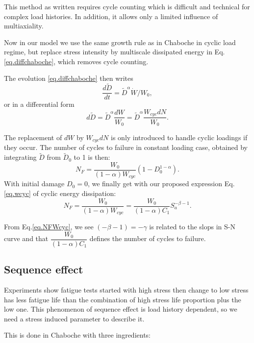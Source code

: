 This method as written requires cycle counting which is difficult and technical for complex load histories. In addition, it allows only a limited influence of multiaxiality.


Now in our model we use the same growth rule as in Chaboche in cyclic load regime, but replace stress intensity by multiscale dissipated energy  in Eq.\eqref{eq.diffchaboche}, which removes cycle counting.

The evolution \eqref{eq.diffchaboche} then writes
$$
\dfrac{d\tilde{D}}{dt} ={\tilde{D}}^\alpha \dot{W}/W_0,
$$
or in a differential form
\begin{equation}
d \tilde{D}=\tilde{D}^\alpha\dfrac{d W}{W_0}=\tilde{D}^\alpha\dfrac{W_{cyc}d N}{W_0}.
\label{eq.DWcyc}
\end{equation}

The replacement of $d W$ by $W_{cyc}dN$ is only introduced to handle cyclic loadings if they occur. The number of cycles to failure in constant loading case, obtained by integrating $\tilde{D}$ from $\tilde{D}_0$ to 1 is then:
$$N_F=\dfrac{W_0}{\left( 1-\alpha\right)W_{cyc} }\left( 1-D_0^{1-\alpha}\right) .$$
With initial damage $D_0=0$, we finally get with our proposed expression Eq.\eqref{eq.wcyc} of cyclic energy dissipation:
\begin{equation}
N_F=\dfrac{W_0}{\left( 1-\alpha\right)W_{cyc} }=\dfrac{W_0}{(1-\alpha)C_1}S_{a}^{-\beta-1}.
\label{eq.NFWcyc}
\end{equation}

From Eq.\eqref{eq.NFWcyc}, we see $(-\beta-1)=-\gamma$ is related to the slops in S-N curve and that $\dfrac{W_0}{(1-\alpha)C_1}$ defines the number of cycles to failure.
\subsection{Sequence effect}

Experiments show fatigue tests started with high stress then change to low stress has less fatigue life than the combination of high stress life proportion plus the low one. This phenomenon of sequence effect is load history dependent, so we need a stress induced parameter to describe it. 

This is done in Chaboche  with three ingredients:

